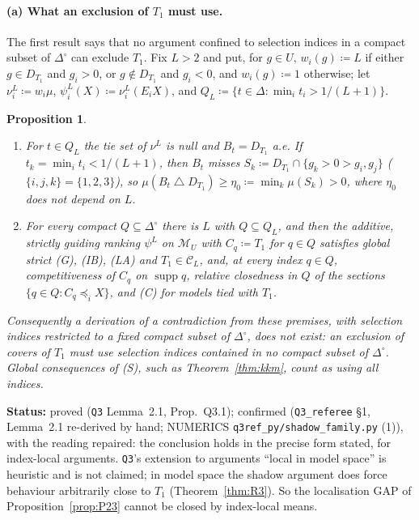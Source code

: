 \documentclass[11pt]{article}
\newtheorem{proposition}[theorem]{Proposition}
\theoremstyle{definition}
\theoremstyle{remark}
\newcommand{\Di}{\Delta^{\circ}}
\newcommand{\M}{\mathcal M}
\newcommand{\C}{\mathcal C}
\newcommand{\supp}{\operatorname{supp}}
\newcommand{\sd}{\mathbin{\triangle}}
\newcommand{\src}[1]{\texttt{#1}}
\newcommand{\status}[1]{\par\smallskip\noindent\textbf{Status:} #1\par\smallskip}
\begin{document}
\paragraph{(a) What an exclusion of $T_1$ must use.} The first result says that no argument confined to selection indices in a compact subset of $\Di$ can exclude $T_1$. Fix $L>2$ and put, for $g\in U$, $w_i(g)\coloneqq L$ if either $g\in D_{T_1}$ and $g_i>0$, or $g\notin D_{T_1}$ and $g_i<0$, and $w_i(g)\coloneqq1$ otherwise; let $\nu^L_i\coloneqq w_i\mu$, $\psi^L_i(X)\coloneqq\nu^L_i(E_iX)$, and $Q_L\coloneqq\{t\in\Delta:\min_it_i>1/(L+1)\}$.

\begin{proposition}\label{prop:Q31}
\begin{enumerate}[leftmargin=*,label=(\alph*)]
\item For $t\in Q_L$ the tie set of $\nu^L$ is null and $B_t=D_{T_1}$ a.e. If $t_k=\min_it_i<1/(L+1)$, then $B_t$ misses $S_k\coloneqq D_{T_1}\cap\{g_k>0>g_i,g_j\}$ ($\{i,j,k\}=\{1,2,3\}$), so $\mu(B_t\sd D_{T_1})\ge\eta_0\coloneqq\min_k\mu(S_k)>0$, where $\eta_0$ does not depend on $L$.
\item For every compact $Q\subseteq\Di$ there is $L$ with $Q\subseteq Q_L$, and then the additive, strictly guiding ranking $\psi^L$ on $\M_U$ with $C_q\coloneqq T_1$ for $q\in Q$ satisfies global strict (G), (IB), (LA) and $T_1\in\C_L$, and, at every index $q\in Q$, competitiveness of $C_q$ on $\supp q$, relative closedness in $Q$ of the sections $\{q\in Q:C_q\preceq_iX\}$, and (C) for models tied with $T_1$.
\end{enumerate}
Consequently a derivation of a contradiction from these premises, with selection indices restricted to a fixed compact subset of $\Di$, does not exist: an exclusion of covers of $T_1$ must use selection indices contained in no compact subset of $\Di$. Global consequences of (S), such as Theorem~\ref{thm:kkm}, count as using all indices.
\end{proposition}
\status{proved (\src{Q3} Lemma~2.1, Prop.~Q3.1); confirmed (\src{Q3\_referee} \S1, Lemma~2.1 re-derived by hand; NUMERICS \src{q3ref\_py/shadow\_family.py} (1)), with the reading repaired: the conclusion holds in the precise form stated, for index-local arguments. \src{Q3}'s extension to arguments ``local in model space'' is heuristic and is not claimed; in model space the shadow argument does force behaviour arbitrarily close to $T_1$ (Theorem~\ref{thm:R3}). So the localisation GAP of Proposition~\ref{prop:P23} cannot be closed by index-local means.}
\end{document}
